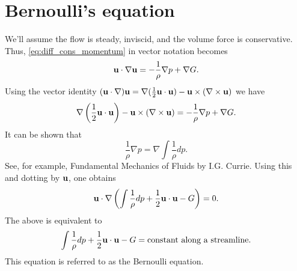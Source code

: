 \documentclass[oneside,a4paper,11pt]{report}
\begin{document}
\section{Bernoulli's equation}
We'll assume the flow is steady, inviscid, and the volume force is conservative. Thus, \cref{eq:diff_cons_momentum} in vector notation becomes
\begin{equation}
    \mathbf{u} \cdot \nabla \mathbf{u} = -\frac{1}{\rho} \nabla p + \nabla G.
\end{equation}
Using the vector identity $(\mathbf{u} \cdot \nabla) \mathbf{u} = \nabla (\frac{1}{2} \mathbf{u} \cdot \mathbf{u}) - \mathbf{u} \times (\nabla \times \mathbf{u}) $ we have
\begin{equation}
    \nabla \left (\frac{1}{2} \mathbf{u} \cdot \mathbf{u} \right) - \mathbf{u} \times (\nabla \times \mathbf{u}) = -\frac{1}{\rho} \nabla p + \nabla G.
\end{equation}
It can be shown that
\begin{equation}
    \frac{1}{\rho} \nabla p = \nabla \int \frac{1}{\rho} dp.
\end{equation}
See, for example, Fundamental Mechanics of Fluids by I.G. Currie. Using this and dotting by $\mathbf{u}$, one obtains
\begin{equation}
    \mathbf{u} \cdot \nabla \left ( \int \frac{1}{\rho} dp + \frac{1}{2} \mathbf{u} \cdot \mathbf{u} -G \right ) = 0.
\end{equation}
The above is equivalent to
\begin{equation}
\label{eq:bernoulli}
\int \frac{1}{\rho} dp + \frac{1}{2} \mathbf{u} \cdot \mathbf{u} -G = \text{constant along a streamline}.
\end{equation}
This equation is referred to as the Bernoulli equation.
\end{document}
